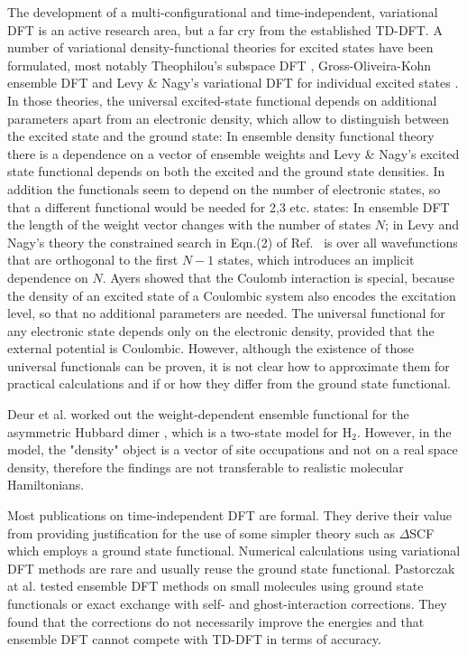 \documentclass[journal=jpclcd,manuscript=letter]{achemso}
\begin{document}
The development of a multi-configurational and time-independent, variational DFT is an active research area,
but a far cry from the established TD-DFT.
A number of variational density-functional theories for excited states have been formulated, most notably
Theophilou's subspace DFT \cite{Theophilou1979}, Gross-Oliveira-Kohn ensemble DFT \cite{Gross1988ReyleighRitz} and
Levy \& Nagy's variational DFT for individual excited states \cite{Levy1999}.
In those theories, the universal excited-state functional depends on additional parameters apart from an electronic density,
which allow to distinguish between the excited state and the ground state: In ensemble density functional theory
\cite{Gross1988ReyleighRitz,Gross1988EnsembleDFT} there is a dependence on a vector of ensemble weights
and Levy \& Nagy's excited state functional \cite{Levy1999} depends on both the excited and the ground state densities.
In addition the functionals seem to depend on
the number of electronic states, so that a different functional would be needed for 2,3 etc. states:
In ensemble DFT the length of the weight vector changes with the number of states $N$;
in Levy and Nagy's theory the constrained search in Eqn.(2) of Ref.~\cite{Levy1999} is over all wavefunctions that are orthogonal
to the first $N-1$ states, which introduces an implicit dependence on $N$.
Ayers showed that the Coulomb interaction is special, because the density of an excited state of a Coulombic system also encodes
the excitation level, so that no additional parameters are needed. \cite{Ayers2012} The universal functional for
any electronic state depends only on the electronic density, provided that the external potential is Coulombic. \cite{Ayers2012}
However, although the existence of those universal functionals can be proven,
it is not clear how to approximate them for practical calculations
and if or how they differ from the ground state functional.

Deur et al. worked out the weight-dependent ensemble functional for the asymmetric Hubbard dimer \cite{Deur2017},
which is a two-state model for H$_2$. However, in the model, the "density" object is a vector of site occupations
and not on a real space density, therefore the findings are not transferable to realistic molecular Hamiltonians.

Most publications on time-independent DFT are formal. They derive their value from providing justification for
the use of some simpler theory such as $\Delta$SCF which employs a ground state functional.
Numerical calculations using variational DFT methods are rare and usually reuse the ground state functional.
Pastorczak at al. tested ensemble DFT methods on small molecules using ground state functionals or exact exchange
with self- and ghost-interaction corrections. \cite{Pastorczak2014} They found that the corrections
do not necessarily improve the energies and that ensemble DFT cannot compete with TD-DFT in terms of accuracy. \cite{Pastorczak2014}
\end{document}

